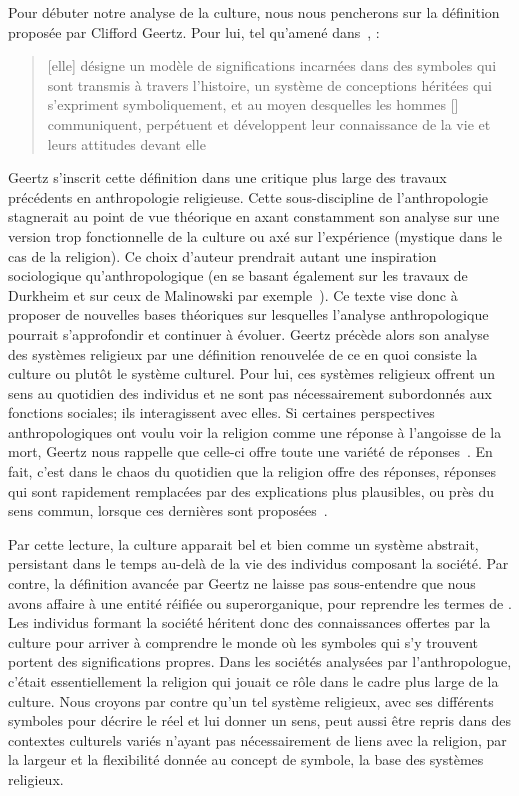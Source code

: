 Pour débuter notre analyse de la culture, nous nous pencherons sur la définition proposée par Clifford Geertz.
Pour lui, tel qu'amené dans~, : \blockquote[{\cite[21]{Geertz1972}}][.]{\textelp{} [elle] désigne un modèle de significations incarnées dans des symboles qui sont transmis à travers l'histoire, un système de conceptions héritées qui s'expriment symboliquement, et au moyen desquelles les hommes [] communiquent, perpétuent et développent leur connaissance de la vie et leurs attitudes devant elle}.
Geertz s'inscrit cette définition dans une critique plus large des travaux précédents en anthropologie religieuse.
Cette sous-discipline de l'anthropologie stagnerait au point de vue théorique en axant constamment son analyse sur une version trop fonctionnelle de la culture ou axé sur l'expérience (mystique dans le cas de la religion).
Ce choix d'auteur prendrait autant une inspiration sociologique qu'anthropologique (en se basant également sur les travaux de Durkheim et sur ceux de Malinowski par exemple~\citep[20]{Geertz1972}).
Ce texte vise donc à proposer de nouvelles bases théoriques sur lesquelles l'analyse anthropologique pourrait s'approfondir et continuer à évoluer.
Geertz précède alors son analyse des systèmes religieux par une définition renouvelée de ce en quoi consiste la culture ou plutôt le système culturel.
Pour lui, ces systèmes religieux offrent un sens au quotidien des individus et ne sont pas nécessairement subordonnés aux fonctions sociales; ils interagissent avec elles.
Si certaines perspectives anthropologiques ont voulu voir la religion comme une réponse à l'angoisse de la mort, Geertz nous rappelle que celle-ci offre toute une variété de réponses~\citep[][37]{Geertz1972}.
En fait, c'est dans le chaos du quotidien que la religion offre des réponses, réponses qui sont rapidement remplacées par des explications plus plausibles, ou près du sens commun, lorsque ces dernières sont proposées~\citep[][39]{Geertz1972}.

Par cette lecture, la culture apparait bel et bien comme un système abstrait, persistant dans le temps au-delà de la vie des individus composant la société.
Par contre, la définition avancée par Geertz ne laisse pas sous-entendre que nous avons affaire à une entité réifiée ou superorganique, pour reprendre les termes de \citet{Duncan1980}.
Les individus formant la société héritent donc des connaissances offertes par la culture pour arriver à comprendre le monde où les symboles qui s'y trouvent portent des significations propres.
Dans les sociétés analysées par l'anthropologue, c'était essentiellement la religion qui jouait ce rôle dans le cadre plus large de la culture.
Nous croyons par contre qu'un tel système religieux, avec ses différents symboles pour décrire le réel et lui donner un sens, peut aussi être repris dans des contextes culturels variés n'ayant pas nécessairement de liens avec la religion, par la largeur et la flexibilité donnée au concept de symbole, la base des systèmes religieux.

